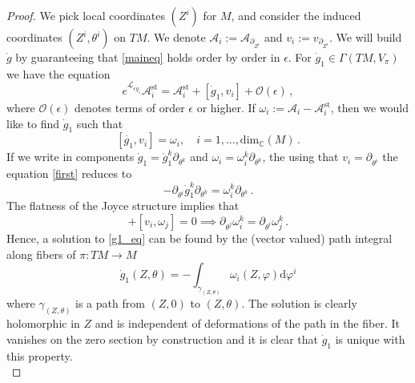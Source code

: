 \documentclass{article}
\theoremstyle{definition}
\numberwithin{equation}{section}
\begin{document}
\begin{proof}

We pick local coordinates $(Z^i)$ for $M$, and consider the induced coordinates $(Z^i,\theta^i)$ on $TM$. We  denote $\mathcal{A}_{i}:=\mathcal{A}_{\partial_{Z^i}}$ and $v_i:=v_{\partial_{Z^i}}$. We will build $\dot{g}$ by guaranteeing that \eqref{maineq} holds order by order in $\epsilon$. For $\dot{g}_1 \in \Gamma(TM,V_{\pi})$ we have the equation
\begin{equation*}
    e^{\mathcal{L}_{\epsilon\dot{g}_1}}\mathcal{A}^{\text{st}}_i=\mathcal{A}_i^{\text{st}}+[\dot{g}_1,v_i]+\mathcal{O}(\epsilon)\,,
\end{equation*}
where $\mathcal{O}(\epsilon)$ denotes terms of order $\epsilon$ or higher. If $\omega_i:=\mathcal{A}_i-\mathcal{A}_i^{\text{st}}$, then we would like to find $\dot{g}_1$ such that 
\begin{equation}\label{first}
    [\dot{g_1},v_i]=\omega_i, \quad i=1,...,\text{dim}_{\mathbb{C}}(M) \,.
\end{equation}
If we write in components $\dot{g}_1=\dot{g}_1^k\partial_{\theta^k}$ and $\omega_i=\omega_i^k\partial_{\theta^{k}}$, the using that $v_{i}=\partial_{\theta^i}$ the equation \eqref{first} reduces to
\begin{equation}\label{g1_eq}
    -\partial_{\theta^i}\dot{g}_1^k\partial_{\theta^k}=\omega_i^k\partial_{\theta^k}\,.
\end{equation}
The flatness of the Joyce structure implies that 
\begin{equation*}
    [\omega_i,v_j]+[v_i,\omega_j]=0 \implies \partial_{\theta^j}\omega_i^k=\partial_{\theta^i}\omega_j^k\,.
\end{equation*} Hence, a solution to \eqref{g1_eq} can be found by the (vector valued) path integral along fibers of $\pi: TM\to M$
\begin{equation}\label{g1_sol}
    \dot{g}_1(Z,\theta)=-\int_{\gamma_{(Z,\theta)}}\omega_i(Z,\varphi)\mathrm{d}\varphi^i
\end{equation}
where $\gamma_{(Z,\theta)}$ is a path from $(Z,0)$ to $(Z,\theta)$. The solution is clearly holomorphic in $Z$ and is independent of deformations of the path in the fiber. It vanishes on the zero section by construction and it is clear that $\dot{g}_1$ is unique with this property.  \\


\end{proof}
\end{document}
